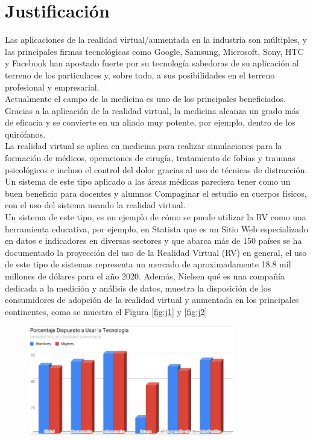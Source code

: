 \section{Justificación}
Las aplicaciones de la realidad virtual/aumentada en la industria son múltiples, y las principales firmas tecnológicas como Google, Samsung, Microsoft, 
Sony, HTC y Facebook han apostado fuerte por su tecnología sabedoras de su aplicación al terreno de los particulares y, sobre todo, a sus posibilidades 
en el terreno profesional y empresarial.\\
Actualmente el campo de la medicina es uno de los principales beneficiados. Gracias a la aplicación de la realidad virtual, la medicina alcanza un grado más de eficacia 
y se convierte en un aliado muy potente, por ejemplo, dentro de los quirófanos.\\
La realidad virtual se aplica en medicina para realizar simulaciones para la formación de médicos, operaciones de cirugía, tratamiento de fobias y traumas 
psicológicos e incluso el control del dolor gracias al uso de técnicas de distracción.\\
Un sistema de este tipo aplicado a las áreas médicas pareciera tener como un buen beneficio para docentes y alumnos Compaginar el estudio en cuerpos físicos, con 
el uso del sistema usando la realidad virtual\cite{norton1994integrating}.\\
Un sistema de este tipo, es un ejemplo de cómo se puede utilizar la RV como una herramienta educativa, por ejemplo,  en Statista\cite{web1} que es un Sitio Web especializado 
en datos e indicadores en diversas sectores y que abarca más de 150 países se ha documentado la proyección del uso de la Realidad Virtual (RV) en general, el 
uso de este tipo de sistemas  representa un mercado de aproximadamente 18.8 mil millones de dólares para el año 2020. Además, Nielsen\cite{web2} qué es una compañía dedicada 
a la medición y análisis de datos,  muestra la disposición de los consumidores de adopción de la realidad virtual y aumentada en los principales continentes, como se muestra el Figura \ref{fig:j1} y \ref{fig:j2}
\begin{figure}[H]
	\begin{center}
 		\includegraphics[width = 0.8\textwidth]{v3/images/chart2.png}
	\end{center} 
\end{figure}
